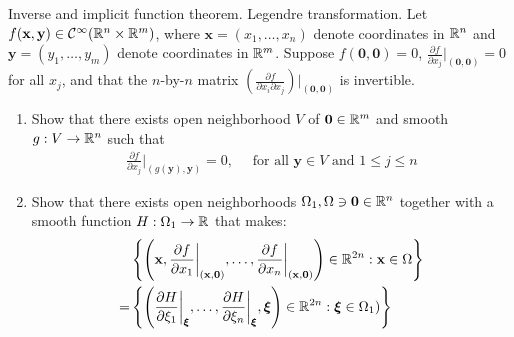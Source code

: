 \documentclass{report}
\begin{document}
\begin{question}{Inverse and implicit function theorem. Legendre transformation.}{}
Let $f(\textbf{x},\textbf{y})\in \mathcal{C}^{\infty} (\mathbb{R}^n \times \mathbb{R}^m)$, where $\textbf{x}=(x_1,\dots ,x_n)$ denote coordinates in $\mathbb{R}^n$ and  $\textbf{y}= (y_1,\dots ,y_m)$ denote coordinates in $\mathbb{R}^m$. Suppose $f(\textbf{0},\textbf{0})=0$, $\frac{\partial f}{\partial x_j}\big|_{(\textbf{0},\textbf{0})}=0$ for all $x_j$, and that the $n$-by-$n$ matrix  $\left(\frac{\partial f}{\partial x_i\partial x_j} \right)\big|_{(\textbf{0},\textbf{0})}$ is invertible. 
\begin{enumerate}[label=(\Roman*)]
  \item Show that there exists open neighborhood $V$ of  $\textbf{0}\in\mathbb{R}^m$ and smooth $g:V\rightarrow \mathbb{R}^n$ such that  
    \begin{align*}
    \frac{\partial f}{\partial x_j}\bigg    |_{\left(g(\textbf{y}),\textbf{y} \right)}=0,\quad \text{ for all }\textbf{y}\in V\text{ and }1\leq j\leq n
    \end{align*} 
    \item Show that there exists open neighborhoods $\Omega_1,\Omega\ni\textbf{0}\in\mathbb{R}^n$ together with a smooth function $H:\Omega_1 \rightarrow \mathbb{R}$ that makes: 
 \begin{align}
\label{EQGs1} &\left\{ \left(\textbf{x}, \frac{\partial f}{\partial x_1} \bigg|_{(\textbf{x},\textbf{0})}, \dots ,\frac{\partial f}{\partial x_n} \bigg  |_{(\textbf{x},\textbf{0})}\right)\in\mathbb{R}^{2n}:\textbf{x} \in \Omega \right\} \\
\label{EQGs2}   =& \left\{  \left( \frac{\partial H}{\partial \xi_1} \bigg |_{\boldsymbol{\xi}} , \dots ,\frac{\partial H}{\partial \xi_n} \bigg |_{\boldsymbol{\xi}},  \boldsymbol{\xi} \right) \in\mathbb{R}^{2n}: \boldsymbol{\xi}\in \Omega_1)   \right\}
 \end{align}
\end{enumerate}
\end{question}
\end{document}
